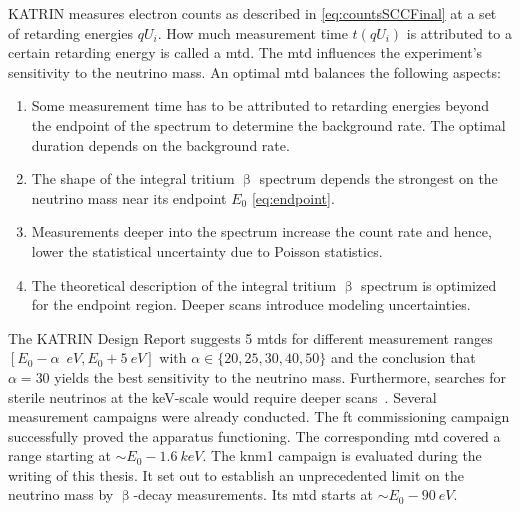 KATRIN measures electron counts as described in \eqref{eq:countsSCCFinal} at a set of retarding energies ${qU_i}$. How much measurement time $t(qU_i)$ is attributed to a certain retarding energy is called a \gls{mtd}. The \gls{mtd} influences the experiment's sensitivity to the neutrino mass. An optimal \gls{mtd} balances the following aspects:
\begin{enumerate}
	\item Some measurement time has to be attributed to retarding energies beyond the endpoint of the spectrum to determine the background rate. The optimal duration depends on the background rate.
	\item The shape of the integral tritium $\upbeta$ spectrum depends the strongest on the neutrino mass near its endpoint $E_0$ \eqref{eq:endpoint}. 
	\item Measurements deeper into the spectrum increase the count rate and hence, lower the statistical uncertainty due to Poisson statistics.
	\item The theoretical description of the integral tritium $\upbeta$ spectrum is optimized for the endpoint region. Deeper scans introduce modeling uncertainties.
\end{enumerate}
The KATRIN Design Report \cite{Angrik:2005ep} suggests 5 \gls{mtd}s for different measurement ranges $[E_0-\alpha\;\SI{}{eV}, E_0 + \SI{5}{eV}]$ with $\alpha \in \{20, 25, 30, 40, 50\}$ and the conclusion that $\alpha=30$ yields the best sensitivity to the neutrino mass. Furthermore, searches for sterile neutrinos at the keV-scale would require deeper scans~\cite{Kleesiek2014}. Several measurement campaigns were already conducted. The \gls{ft} commissioning campaign successfully proved the apparatus functioning. The corresponding \gls{mtd} covered a range starting at $\sim E_0-\SI{1.6}{keV}$. The \gls{knm1} campaign is evaluated during the writing of this thesis. It set out to establish an unprecedented limit on the neutrino mass by $\upbeta$-decay measurements. Its \gls{mtd} starts at $\sim E_0-\SI{90}{eV}$.
